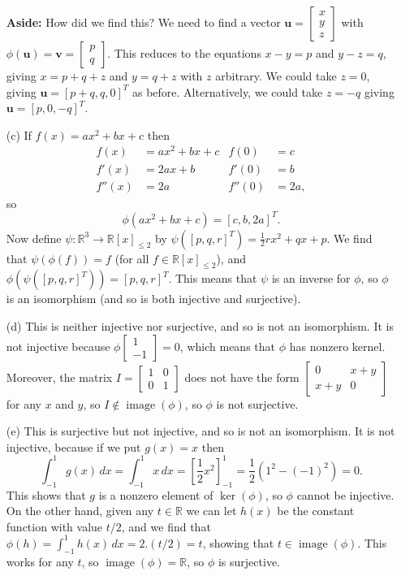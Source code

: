 \documentclass{amsart}
\newcommand{\R}         {{\mathbb{R}}}
\newcommand{\img}       {\operatorname{image}}
\newcommand{\bsm}       {\left[\begin{smallmatrix}}
\newcommand{\esm}       {\end{smallmatrix}\right]}
\newcommand{\half}      {{\textstyle\frac{1}{2}}}
\newcommand{\vu}        {\mathbf{u}}
\newcommand{\vv}        {\mathbf{v}}
\renewcommand{\:}       {\colon}
\theoremstyle{definition}
\renewenvironment{solution}{\SolutionAtEnd}{\endSolutionAtEnd}
\begin{document}
\begin{solution}
\begin{itemize}
   \textbf{Aside:} How did we find this?  We need to find a vector
   $\vu=\bsm x\\ y\\ z\esm$ with $\phi(\vu)=\vv=\bsm p\\ q\esm$.  This
   reduces to the equations $x-y=p$ and $y-z=q$, giving $x=p+q+z$ and
   $y=q+z$ with $z$ arbitrary.  We could take $z=0$, giving
   $\vu=[p+q,q,0]^T$ as before.  Alternatively, we could take $z=-q$
   giving $\vu=[p,0,-q]^T$.  
  \item[(c)] If $f(x)=ax^2+bx+c$ then 
   \begin{align*}
    f(x)   &= ax^2 + bx + c & f(0)   &= c \\
    f'(x)  &= 2ax + b       & f'(0)  &= b \\
    f''(x) &= 2a            & f''(0) &= 2a,
   \end{align*}
   so 
   \[ \phi(ax^2+bx+c) = [c,b,2a]^T. \]
   Now define $\psi\:\R^3\to\R[x]_{\leq 2}$ by 
   $\psi([p,q,r]^T)=\half r x^2+qx+p$.  We find that
   $\psi(\phi(f))=f$ (for all $f\in\R[x]_{\leq 2}$), and
   $\phi(\psi([p,q,r]^T))=[p,q,r]^T$.  This means that
   $\psi$ is an inverse for $\phi$, so $\phi$ is an
   isomorphism (and so is both injective and surjective). 
  \item[(d)] This is neither injective nor surjective, and
   so is not an isomorphism.  It is not injective because
   $\phi\bsm 1\\-1\esm=0$, which means that $\phi$ has
   nonzero kernel.  Moreover, the matrix $I=\bsm
   1&0\\0&1\esm$ does not have the form
   $\bsm 0&x+y\\ x+y&0\esm$ for any $x$ and $y$, so
   $I\not\in\img(\phi)$, so $\phi$ is not surjective. 
  \item[(e)] This is surjective but not injective, and so is
   not an isomorphism.  It is not injective, because if we
   put $g(x)=x$ then 
   \[ \int_{-1}^1 g(x)\,dx=\int_{-1}^1 x\,dx=
       \left[ \half x^2 \right]_{-1}^1 = 
        \half(1^2 - (-1)^2) = 0. 
   \]
   This shows that $g$ is a nonzero element of $\ker(\phi)$,
   so $\phi$ cannot be injective.  On the other hand, given
   any $t\in\R$ we can let $h(x)$ be the constant function
   with value $t/2$, and we find that
   $\phi(h)=\int_{-1}^1h(x)\,dx=2.(t/2)=t$, showing that
   $t\in\img(\phi)$.  This works for any $t$, so
   $\img(\phi)=\R$, so $\phi$ is surjective. 
 \end{itemize}
\end{solution}
\end{document}
